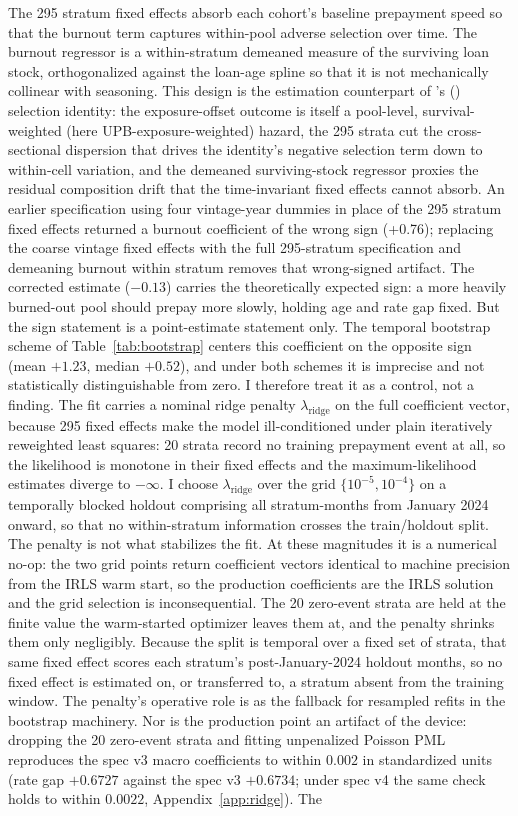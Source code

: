 \documentclass[12pt]{article}
\newcommand{\citepos}[1]{\citeauthor{#1}'s (\citeyear{#1})}
\begin{document}
The 295 stratum fixed effects absorb each cohort's baseline prepayment speed so that the burnout term captures within-pool adverse selection over time. The burnout regressor is a within-stratum demeaned measure of the surviving loan stock, orthogonalized against the loan-age spline so that it is not mechanically collinear with seasoning. This design is the estimation counterpart of \citepos{lesniewski2026} selection identity: the exposure-offset outcome is itself a pool-level, survival-weighted (here UPB-exposure-weighted) hazard, the 295 strata cut the cross-sectional dispersion that drives the identity's negative selection term down to within-cell variation, and the demeaned surviving-stock regressor proxies the residual composition drift that the time-invariant fixed effects cannot absorb. An earlier specification using four vintage-year dummies in place of the 295 stratum fixed effects returned a burnout coefficient of the wrong sign (+0.76); replacing the coarse vintage fixed effects with the full 295-stratum specification and demeaning burnout within stratum removes that wrong-signed artifact. The corrected estimate ($-0.13$) carries the theoretically expected sign: a more heavily burned-out pool should prepay more slowly, holding age and rate gap fixed. But the sign statement is a point-estimate statement only. The temporal bootstrap scheme of Table~\ref{tab:bootstrap} centers this coefficient on the opposite sign (mean $+1.23$, median $+0.52$), and under both schemes it is imprecise and not statistically distinguishable from zero. I therefore treat it as a control, not a finding. The fit carries a nominal ridge penalty $\lambda_{\mathrm{ridge}}$ on the full coefficient vector, because 295 fixed effects make the model ill-conditioned under plain iteratively reweighted least squares: 20 strata record no training prepayment event at all, so the likelihood is monotone in their fixed effects and the maximum-likelihood estimates diverge to $-\infty$. I choose $\lambda_{\mathrm{ridge}}$ over the grid $\{10^{-5}, 10^{-4}\}$ on a temporally blocked holdout comprising all stratum-months from January 2024 onward, so that no within-stratum information crosses the train/holdout split. The penalty is not what stabilizes the fit. At these magnitudes it is a numerical no-op: the two grid points return coefficient vectors identical to machine precision from the IRLS warm start, so the production coefficients are the IRLS solution and the grid selection is inconsequential. The 20 zero-event strata are held at the finite value the warm-started optimizer leaves them at, and the penalty shrinks them only negligibly. Because the split is temporal over a fixed set of strata, that same fixed effect scores each stratum's post-January-2024 holdout months, so no fixed effect is estimated on, or transferred to, a stratum absent from the training window. The penalty's operative role is as the fallback for resampled refits in the bootstrap machinery. Nor is the production point an artifact of the device: dropping the 20 zero-event strata and fitting unpenalized Poisson PML reproduces the spec v3 macro coefficients to within $0.002$ in standardized units (rate gap $+0.6727$ against the spec v3 $+0.6734$; under spec v4 the same check holds to within $0.0022$, Appendix~\ref{app:ridge}). The 
\end{document}
